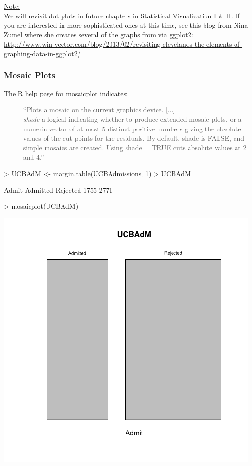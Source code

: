 \documentclass[12pt,letterpaper,final]{article}
\begin{document}
\underline{Note:} \\
We will revisit dot plots in future chapters in Statistical Visualization I \& II.
If you are interested in more sophisticated ones at this time, see this blog
from Nina Zumel where she creates several of the graphs from \cite{Cle94}
via ggplot2: \\
\url{http://www.win-vector.com/blog/2013/02/revisiting-clevelands-the-elements-of-graphing-data-in-ggplot2/}


\newpage


\subsubsection{Mosaic Plots}


The R help page for mosaicplot indicates:
\begin{quotation}
``Plots a mosaic on the current graphics device. [$\ldots$] \\
{\it shade} a logical indicating whether to produce extended mosaic plots, 
or a numeric vector of at most 5 distinct positive numbers giving the absolute values 
of the cut points for the residuals. By default, shade is FALSE, and simple mosaics are created. 
Using shade = TRUE cuts absolute values at 2 and 4.''
\end{quotation}


\begin{Schunk}
\begin{Sinput}
> UCBAdM <- margin.table(UCBAdmissions, 1)
> UCBAdM
\end{Sinput}
\begin{Soutput}
Admit
Admitted Rejected 
    1755     2771 
\end{Soutput}
\begin{Sinput}
> mosaicplot(UCBAdM)
\end{Sinput}
\end{Schunk}
\includegraphics{lect_main-038}
\end{document}
